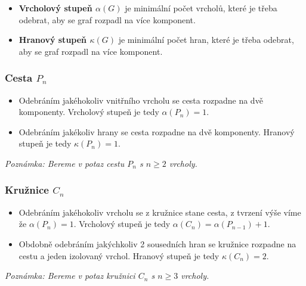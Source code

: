 \documentclass[10pt, a4paper]{ReportSheet}
\begin{document}

    \newpage


    \begin{itemize}
        \item \textbf{Vrcholový stupeň $\alpha(G)$} je minimální počet vrcholů, které je třeba odebrat, aby se graf
        rozpadl na více komponent.
        \item \textbf{Hranový stupeň $\kappa(G)$} je minimální počet hran, které je třeba odebrat, aby se graf rozpadl
        na více komponent.
    \end{itemize}

    \subsubsection{Cesta $P_n$}
    \label{subsubsec:ukol-2-8-cesta}
    \begin{itemize}
        \item Odebráním jakéhokoliv vnitřního vrcholu se cesta rozpadne na dvě komponenty. Vrcholový stupeň je tedy $\alpha(P_n) = 1$.
        \item Odebráním jakékoliv hrany se cesta rozpadne na dvě komponenty. Hranový stupeň je tedy $\kappa(P_n) = 1$.
    \end{itemize}
    \textit{Poznámka: Bereme v potaz cestu $P_n$ s $n \geq 2$ vrcholy.}

    \subsubsection{Kružnice $C_n$}
    \begin{itemize}
        \item Odebráním jakéhokoliv vrcholu se z kružnice stane cesta, z tvrzení výše víme že $\alpha(P_n) = 1$.
        Vrcholový stupeň je tedy $\alpha(C_n) = \alpha(P_{n-1}) + 1$.
        \item Obdobně odebráním jakýchkoliv 2 sousedních hran se kružnice rozpadne na cestu a jeden izolovaný vrchol. Hranový stupeň je tedy $\kappa(C_n) = 2$.
    \end{itemize}
    \textit{Poznámka: Bereme v potaz kružnici $C_n$ s $n \geq 3$ vrcholy.}
\end{document}
